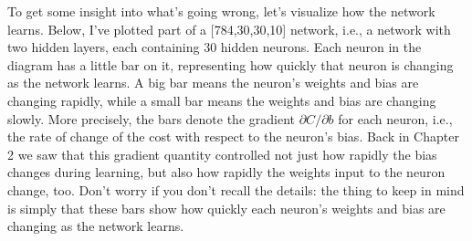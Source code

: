 \documentclass[a4paper,twoside,10pt]{book}
\begin{document}
To get some insight into what's going wrong, let's visualize how the network learns. Below, I've plotted part of a [784,30,30,10] network, i.e., a network with two hidden layers, each containing 30 hidden neurons. Each neuron in the diagram has a little bar on it, representing how quickly that neuron is changing as the network learns. A big bar means the neuron's weights and bias are changing rapidly, while a small bar means the weights and bias are changing slowly. More precisely, the bars denote the gradient $\partial C/\partial b$ for each neuron, i.e., the rate of change of the cost with respect to the neuron's bias. Back in Chapter 2 we saw that this gradient quantity controlled not just how rapidly the bias changes during learning, but also how rapidly the weights input to the neuron change, too. Don't worry if you don't recall the details: the thing to keep in mind is simply that these bars show how quickly each neuron's weights and bias are changing as the network learns.
\end{document}
